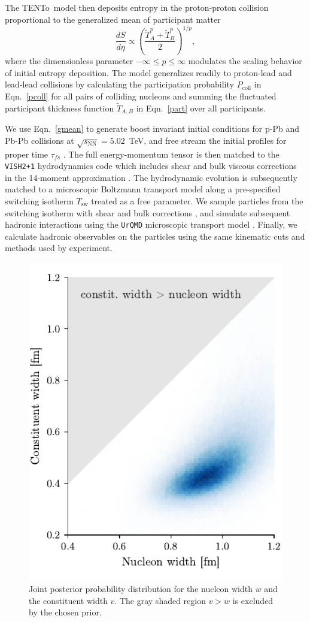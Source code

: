\documentclass[3p,times,procedia,sort&compress]{elsarticle}
\newcommand{\trento}{T\raisebox{-0.3ex}{R}ENTo}
\newcommand{\sqrts}{\sqrt{s_\mathrm{NN}}}
\newcommand{\T}{\tilde{T}}
\begin{document}
The \trento\ model then deposits entropy in the proton-proton collision proportional to the generalized mean of participant matter
\begin{equation}
  \label{gmean}
  \frac{dS}{d\eta} \propto \left(\frac{\T_A^p + \T_B^p}{2} \right)^{1/p},
\end{equation}
where the dimensionless parameter ${-\infty \le p \le \infty}$ modulates the scaling behavior of initial entropy deposition.
The model generalizes readily to proton-lead and lead-lead collisions by calculating the participation probability $P_\text{coll}$ in Eqn.~\eqref{pcoll} for all pairs of colliding nucleons and summing the fluctuated participant thickness function $\T_{A,B}$ in Eqn.~\eqref{part} over all participants.

We use Eqn.~\eqref{gmean} to generate boost invariant initial conditions for p-Pb and Pb-Pb collisions at $\sqrts=5.02$~TeV, and free stream the initial profiles for proper time $\tau_{fs}$ \cite{Liu:2015nwa}.
The full energy-momentum tensor is then matched to the \texttt{VISH2+1} hydrodynamics code \cite{Song:2007ux, Shen:2014vra} which includes shear and bulk viscous corrections in the 14-moment approximation \cite{Bernhard:2016tnd}.
The hydrodynamic evolution is subsequently matched to a microscopic Boltzmann transport model along a pre-specified switching isotherm $T_\text{sw}$ treated as a free parameter.
We sample particles from the switching isotherm with shear and bulk corrections \cite{Bernhard:2018hnz}, and simulate subsequent hadronic interactions using the \texttt{UrQMD} microscopic transport model \cite{Bass:1998ca}.
Finally, we calculate hadronic observables on the particles using the same kinematic cuts and methods used by experiment.

\begin{figure}
  \includegraphics[width=.45\textwidth]{posterior_proton_shape}
  \caption{\label{fig:proton_shape} Joint posterior probability distribution for the nucleon width $w$ and the constituent width $v$. The gray shaded region $v > w$ is excluded by the chosen prior.}
\end{figure}
\end{document}
